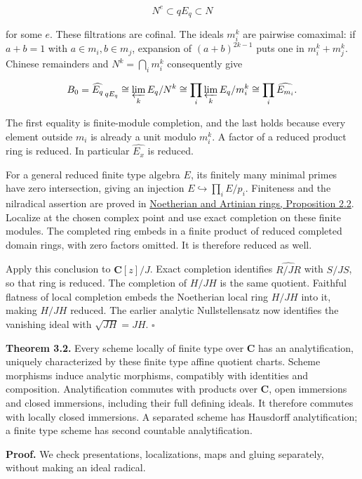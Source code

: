 \documentclass[11pt]{article}
\begin{document}
\[
N^e\subset qE_q\subset N
\]

for some \(e\). These filtrations are cofinal. The ideals \(m_i^k\) are
pairwise comaximal: if \(a+b=1\) with \(a\in m_i,b\in m_j\), expansion
of \((a+b)^{2k-1}\) puts one in \(m_i^k+m_j^k\). Chinese remainders and
\(N^k=\bigcap_i m_i^k\) consequently give

\[
B_0=\widehat{E_q}_{\,qE_q}
\cong\varprojlim_k E_q/N^k
\cong\prod_i\varprojlim_k E_q/m_i^k
\cong\prod_i\widehat{E_{m_i}}.
\]

The first equality is finite-module completion, and the last holds
because every element outside \(m_i\) is already a unit modulo
\(m_i^k\). A factor of a reduced product ring is reduced. In particular
\(\widehat{E_x}\) is reduced.

For a general reduced finite type algebra \(E\), its finitely many
minimal primes have zero intersection, giving an injection
\(E\hookrightarrow\prod_i E/p_i\). Finiteness and the nilradical
assertion are proved in
\href{../AG-CA/AG-CA-03.html\#2-polynomial-rings-and-finite-geometric-descriptions}{Noetherian
and Artinian rings, Proposition 2.2}. Localize at the chosen complex
point and use exact completion on these finite modules. The completed
ring embeds in a finite product of reduced completed domain rings, with
zero factors omitted. It is therefore reduced as well.

Apply this conclusion to \(\mathbf C[z]/J\). Exact completion identifies
\(\widehat{R/JR}\) with \(S/JS\), so that ring is reduced. The
completion of \(H/JH\) is the same quotient. Faithful flatness of local
completion embeds the Noetherian local ring \(H/JH\) into it, making
\(H/JH\) reduced. The earlier analytic Nullstellensatz now identifies
the vanishing ideal with \(\sqrt{JH}=JH\). \(\square\)

\textbf{Theorem 3.2.} Every scheme locally of finite type over
\(\mathbf C\) has an analytification, uniquely characterized by these
finite type affine quotient charts. Scheme morphisms induce analytic
morphisms, compatibly with identities and composition. Analytification
commutes with products over \(\mathbf C\), open immersions and closed
immersions, including their full defining ideals. It therefore commutes
with locally closed immersions. A separated scheme has Hausdorff
analytification; a finite type scheme has second countable
analytification.

\textbf{Proof.} We check presentations, localizations, maps and gluing
separately, without making an ideal radical.
\end{document}
